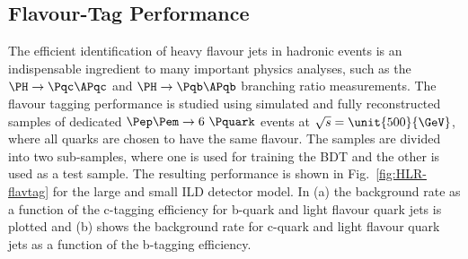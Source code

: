 
\subsection{Flavour-Tag Performance}
\label{sec:perf:hlr:lcfi}
The efficient identification of heavy flavour jets in hadronic events is an indispensable ingredient to many important physics analyses, such as
the $\PH\rightarrow\Pqc\APqc$ and $\PH\rightarrow\Pqb\APqb$ branching ratio  measurements.
The flavour tagging performance is studied using simulated and fully reconstructed samples
of dedicated $\Pep \Pem \rightarrow 6~\Pquark$ events at $\sqrt{s}=\unit{500}{\GeV}$, where all quarks are chosen to have the same flavour.
The samples are divided into two sub-samples, where one is used for training the BDT and the other is used
as a test sample. The resulting performance is shown in Fig.~\ref{fig:HLR-flavtag} for the large and small ILD detector model.
In (a) the background rate as a function of the c-tagging efficiency for b-quark and light flavour quark jets is plotted and (b) shows the
 background rate for c-quark and light flavour quark jets as a function of the b-tagging efficiency.
%
